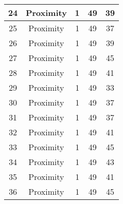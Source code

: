 \documentclass[results.tex]{subfiles}
\begin{document}
\begin{center}
\begin{tabular}{| c || c | c | c | c |}
            \hline
            24                      & Proximity                    & 1                      & 49                      & 39                   \\
            \hline
            25                      & Proximity                    & 1                      & 49                      & 37                   \\
            \hline
            26                      & Proximity                    & 1                      & 49                      & 39                   \\
            \hline
            27                      & Proximity                    & 1                      & 49                      & 45                   \\
            \hline
            28                      & Proximity                    & 1                      & 49                      & 41                   \\
            \hline
            29                      & Proximity                    & 1                      & 49                      & 33                   \\
            \hline
            30                      & Proximity                    & 1                      & 49                      & 37                   \\
            \hline
            31                      & Proximity                    & 1                      & 49                      & 37                   \\
            \hline
            32                      & Proximity                    & 1                      & 49                      & 41                   \\
            \hline
            33                      & Proximity                    & 1                      & 49                      & 45                   \\
            \hline
            34                      & Proximity                    & 1                      & 49                      & 43                   \\
            \hline
            35                      & Proximity                    & 1                      & 49                      & 41                   \\
            \hline
            36                      & Proximity                    & 1                      & 49                      & 45                   \\

\end{tabular}
\end{center}
\end{document}

